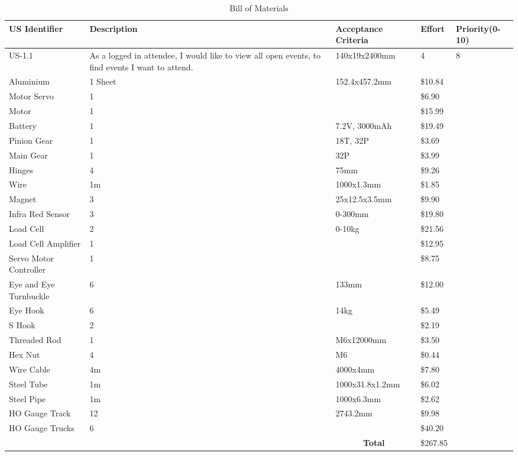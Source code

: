\documentclass[a4paper]{article}
\begin{document}
\begin{table}[ht]
\caption{Bill of Materials}

\begin{center}

	\begin{tabular}{|l|l|l|l|l|}
	
	\hline 
	\textbf{US Identifier} & \textbf{Description} & \textbf{Acceptance Criteria} & \textbf{Effort} & \textbf{Priority(0-10)} \\
	\hline
	US-1.1 & As a logged in attendee, I would like to view all open events, to find events I want to attend. & 140x19x2400mm & 4 & 8 \\
	\hline
	Aluminium \cite{bunnings} & 1 Sheet & 152.4x457.2mm & \$10.84 \\
	\hline
	Motor Servo \cite{servo} & 1 & & \$6.90 \\
	\hline
	Motor \cite{motor} & 1 & & \$15.99 \\
	\hline
	Battery \cite{hobby} & 1 & 7.2V, 3000mAh & \$19.49 \\
	\hline
	Pinion Gear \cite{hobby} & 1 & 18T, 32P & \$3.69 \\
	\hline
	Main Gear \cite{hobby} & 1 & 32P & \$3.99 \\
	\hline
	Hinges \cite{bunnings} & 4 & 75mm & \$9.26 \\
	\hline
	Wire \cite{bunnings} & 1m & 1000x1.3mm & \$1.85 \\
	\hline
	Magnet \cite{bunnings} & 3 & 25x12.5x3.5mm & \$9.90 \\
	\hline
	Infra Red Sensor \cite{irgate} & 3 & 0-300mm & \$19.80 \\
	\hline
	Load Cell \cite{load} & 2 & 0-10kg & \$21.56 \\
	\hline
	Load Cell Amplifier \cite{load} & 1 & & \$12.95 \\
	\hline
	Servo Motor Controller \cite{cont} & 1 & & \$8.75 \\
	\hline
	Eye and Eye Turnbuckle \cite{bunnings} & 6 & 133mm & \$12.00 \\
	\hline
	Eye Hook \cite{bunnings} & 6 & 14kg & \$5.49 \\
	\hline
	S Hook \cite{bunnings} & 2 & & \$2.19 \\
	\hline
	Threaded Rod \cite{bunnings} & 1 & M6x12000mm & \$3.50 \\
	\hline
	Hex Nut \cite{bunnings} & 4 & M6 & \$0.44 \\
	\hline
	Wire Cable \cite{bunnings} & 4m & 4000x4mm & \$7.80 \\
	\hline
	Steel Tube \cite{bunnings} & 1m & 1000x31.8x1.2mm & \$6.02 \\
	\hline
	Steel Pipe \cite{bunnings} & 1m & 1000x6.3mm & \$2.62 \\
	\hline
	HO Gauge Track \cite{hobby} & 12 & 2743.2mm & \$9.98 \\
	\hline
	HO Gauge Trucks \cite{hobby} & 6 & & \$40.20 \\
	\hline
	\multicolumn{1}{c}{} & & \multicolumn{1}{|c|}{\textbf{Total}} & \$267.85 \\
	\cline{3-4}



\end{tabular}
\end{center}
\end{table}
\end{document}
